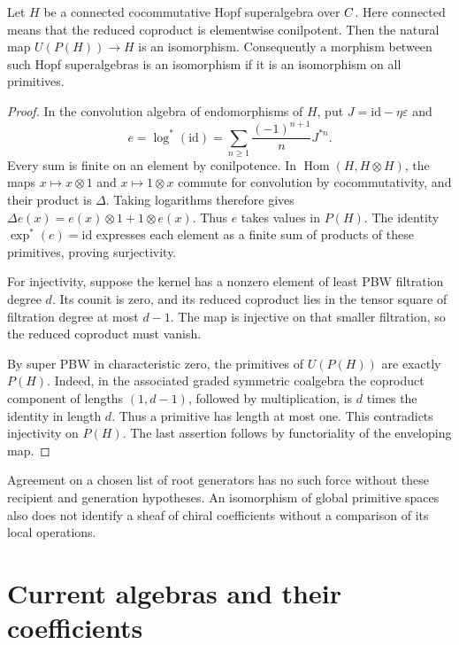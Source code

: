 \begin{proposition}
\label{prop:bkm-connected-hopf-recognition}
Let $H$ be a connected cocommutative Hopf superalgebra over $C$.
Here connected means that the reduced coproduct is elementwise
conilpotent. Then the natural map $U(P(H))\to H$ is an isomorphism.
Consequently a morphism between such Hopf superalgebras is an
isomorphism if it is an isomorphism on all primitives.
\end{proposition}
\begin{proof}
In the convolution algebra of endomorphisms of $H$, put
$J=\mathrm{id}-\eta\varepsilon$ and
\[
 e=\log^*(\mathrm{id})
   =\sum_{n\geq1}\frac{(-1)^{n+1}}nJ^{*n}.
\]
Every sum is finite on an element by conilpotence. In
$\operatorname{Hom}(H,H\otimes H)$, the maps $x\mapsto x\otimes1$
and $x\mapsto1\otimes x$ commute for convolution by
cocommutativity, and their product is $\Delta$. Taking logarithms
therefore gives $\Delta e(x)=e(x)\otimes1+1\otimes e(x)$.
Thus $e$ takes values in $P(H)$. The identity
$\exp^*(e)=\mathrm{id}$ expresses each element as a finite sum
of products of these primitives, proving surjectivity.

For injectivity, suppose the kernel has a nonzero element of least
PBW filtration degree $d$. Its counit is zero, and its reduced
coproduct lies in the tensor square of filtration degree at most
$d-1$. The map is injective on that smaller filtration, so the
reduced coproduct must vanish.

By super PBW in characteristic zero,
the primitives of $U(P(H))$ are exactly $P(H)$. Indeed, in the
associated graded symmetric coalgebra the coproduct component of
lengths $(1,d-1)$, followed by multiplication, is $d$ times the
identity in length $d$. Thus a primitive has length at most one.
This contradicts injectivity on $P(H)$.
The last assertion follows by functoriality of the enveloping map.
\end{proof}

Agreement on a chosen list of root generators has no such force
without these recipient and generation hypotheses. An isomorphism
of global primitive spaces also does not identify a sheaf of chiral
coefficients without a comparison of its local operations.

\section{Current algebras and their coefficients}
\label{sec:bkm-source-target}

